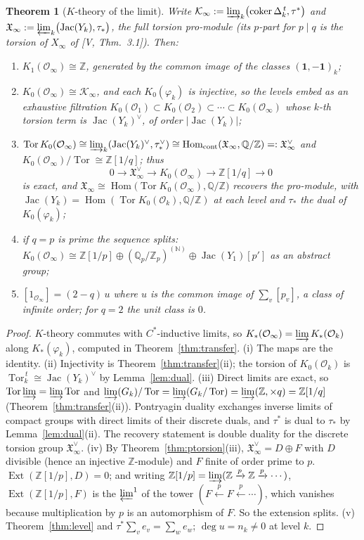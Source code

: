 \documentclass[11pt]{amsart}
\numberwithin{equation}{section}
\newtheorem{theorem}{Theorem}[section]
\theoremstyle{definition}
\theoremstyle{remark}
\newcommand{\Z}{\mathbb{Z}}
\newcommand{\Q}{\mathbb{Q}}
\newcommand{\Zp}{\Z_p}
\newcommand{\Qp}{\Q_p}
\newcommand{\cO}{\mathcal{O}}
\newcommand{\cK}{\mathcal{K}}
\newcommand{\XX}{\mathfrak{X}_\infty}
\newcommand{\Jac}{\operatorname{Jac}}
\newcommand{\coker}{\operatorname{coker}}
\newcommand{\Tor}{\operatorname{Tor}}
\newcommand{\Hom}{\operatorname{Hom}}
\newcommand{\Ext}{\operatorname{Ext}}
\newcommand{\ta}{\tau_*}
\newcommand{\taup}{\tau^*}
\begin{document}
\begin{theorem}[$K$-theory of the limit]\label{thm:klimit}
Write $\cK_\infty:=\varinjlim_k\bigl(\coker\Delta_k^{\,t},\taup\bigr)$ and
$\XX:=\varprojlim_k\bigl(\Jac(Y_k),\ta\bigr)$, the full torsion pro-module (its $p$-part
for $p\mid q$ is the torsion of $X_\infty$ of {\rm[V, Thm.~3.1]}). Then:
\begin{enumerate}
\item[(i)] $K_1(\cO_\infty)\cong\Z$, generated by the common image of the classes
$(\mathbf1,-\mathbf1)_k$;
\item[(ii)] $K_0(\cO_\infty)\cong\cK_\infty$, and each $K_0(\varphi_k)$ is injective, so the
levels embed as an exhaustive filtration
$K_0(\cO_1)\subset K_0(\cO_2)\subset\cdots\subset K_0(\cO_\infty)$ whose $k$-th torsion
term is $\Jac(Y_k)^{\vee}$, of order $|\Jac(Y_k)|$;
\item[(iii)] $\Tor K_0(\cO_\infty)\cong\varinjlim_k(\Jac(Y_k)^{\vee},\ta^{\vee})
\cong\Hom_{\mathrm{cont}}(\XX,\Q/\Z)=:\XX^{\vee}$ and
$K_0(\cO_\infty)/\Tor\cong\Z[1/q]$; thus
\[
0\longrightarrow\XX^{\vee}\longrightarrow K_0(\cO_\infty)\longrightarrow\Z[1/q]\longrightarrow0
\]
is exact, and $\XX\cong\Hom\bigl(\Tor K_0(\cO_\infty),\Q/\Z\bigr)$ recovers the pro-module,
with $\Jac(Y_k)=\Hom(\Tor K_0(\cO_k),\Q/\Z)$ at each level and $\ta$ the dual of
$K_0(\varphi_k)$;
\item[(iv)] if $q=p$ is prime the sequence splits:
$K_0(\cO_\infty)\cong\Z[1/p]\oplus(\Qp/\Zp)^{(\mathbb N)}\oplus\Jac(Y_1)[p']$ as an abstract
group;
\item[(v)] $[1_{\cO_\infty}]=(2-q)\,u$ where $u$ is the common image of $\sum_v[p_v]$, a
class of infinite order; for $q=2$ the unit class is $0$.
\end{enumerate}
\end{theorem}

\begin{proof}
$K$-theory commutes with $C^*$-inductive limits, so $K_*(\cO_\infty)=\varinjlim K_*(\cO_k)$
along $K_*(\varphi_k)$, computed in Theorem~\ref{thm:transfer}. (i) The maps are the
identity. (ii) Injectivity is Theorem~\ref{thm:transfer}(ii); the torsion of $K_0(\cO_k)$
is $\Tor_k^{\,t}\cong\Jac(Y_k)^{\vee}$ by Lemma~\ref{lem:dual}. (iii) Direct limits are
exact, so $\Tor\varinjlim=\varinjlim\Tor$ and $\varinjlim(G_k)/\Tor=\varinjlim(G_k/\Tor)
=\varinjlim(\Z,\times q)=\Z[1/q]$ (Theorem~\ref{thm:transfer}(ii)). Pontryagin duality
exchanges inverse limits of compact groups with direct limits of their discrete duals,
and $\taup$ is dual to $\ta$ by Lemma~\ref{lem:dual}(ii). The recovery statement is
double duality for the discrete torsion group $\XX^{\vee}$. (iv) By
Theorem~\ref{thm:ptorsion}(iii), $\XX^{\vee}=D\oplus F$ with $D$ divisible (hence an
injective $\Z$-module) and $F$ finite of order prime to $p$. $\Ext(\Z[1/p],D)=0$; and
writing $\Z[1/p]=\varinjlim(\Z\xrightarrow{p}\Z\xrightarrow{p}\cdots)$,
$\Ext(\Z[1/p],F)$ is the $\varprojlim^1$ of the tower $(F\xleftarrow{p}F\xleftarrow{p}\cdots)$,
which vanishes because multiplication by $p$ is an automorphism of $F$. So the extension
splits. (v) Theorem~\ref{thm:level} and $\taup\sum_ve_v=\sum_we_w$; $\deg u=n_k\ne0$ at
level $k$.
\end{proof}
\end{document}
